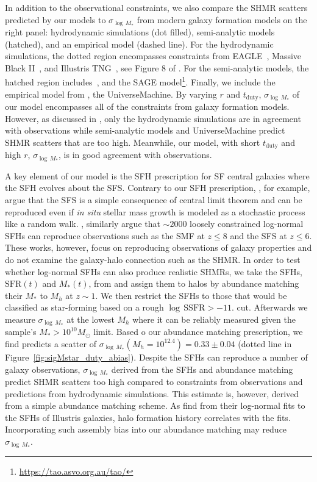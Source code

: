 \documentclass[12pt, letterpaper, preprint, tighten]{aastex62}
\begin{document}
In addition to the observational constraints, we also compare the SHMR 
scatters predicted by our models to $\sigma_{\log\,M_*}$ from modern 
galaxy formation models on the right panel: hydrodynamic simulations 
(dot filled), semi-analytic models (hatched), and an empirical model 
(dashed line). For the hydrodynamic simulations, the dotted region 
encompasses constraints from EAGLE~\citep{mcalpine2016}, Massive 
Black II~\citep{khandai2015}, and Illustris TNG~\citep{pillepich2018}, 
see Figure 8 of \cite{wechsler2018}. For the semi-analytic models, the 
hatched region includes~\cite{lu2014, somerville2012}, 
and the SAGE model\footnote{\url{https://tao.asvo.org.au/tao/}}. Finally, we 
include the empirical model from \cite{behroozi2018a}, the {\sc UniverseMachine}.
By varying $r$ and $t_\mathrm{duty}$, $\sigma_{\log\,M_*}$ of our model 
encompasses all of the constraints from galaxy formation models. However, as
discussed in \cite{wechsler2018}, only the hydrodynamic simulations are in 
agreement with observations while semi-analytic models and {\sc UniverseMachine}
predict SHMR scatters that are too high. Meanwhile, our model, with short 
$t_\mathrm{duty}$ and high $r$, $\sigma_{\log\,M_*}$, is in good agreement with 
observations. 

A key element of our model is the SFH prescription for SF central galaxies where 
the SFH evolves about the SFS. Contrary to our SFH prescription, \cite{kelson2014}, 
for example, argue that the SFS is a simple consequence of central limit theorem 
and can be reproduced even if \emph{in situ} stellar mass growth is modeled as 
a stochastic process like a random walk. \cite{gladders2013,abramson2015,abramson2016}, 
similarly argue that $\sim2000$ loosely constrained log-normal SFHs can reproduce 
observations such as the SMF at $z \leq 8$ and the SFS at $z \leq 6$. These works, 
however, focus on reproducing observations of galaxy properties and do not examine
the galaxy-halo connection such as the SHMR. In order to test whether log-normal 
SFHs can also produce realistic SHMRs, we take the SFHs, $\mathrm{SFR}(t)$ and 
$M_*(t)$, from \cite{abramson2016} and assign them to halos by abundance matching 
their $M_*$ to $M_h$ at $z{\sim}1$. We then restrict the SFHs to those that would 
be classified as star-forming based on a rough $\log\,\mathrm{SSFR} > -11.$ cut.
Afterwards we measure $\sigma_{\log\,M_*}$ at the lowest $M_h$ where it can be 
reliably measured given the \cite{abramson2016} sample's $M_*{>}10^{10}M_\odot$ 
limit. Based o our abundance matching prescription, we find \cite{abramson2016}
predicts a scatter of $\sigma_{\log\,M_*}(M_h=10^{12.4}) = 0.33\pm0.04$ (dotted 
line in Figure~\ref{fig:sigMstar_duty_abias}). Despite the \cite{abramson2016} SFHs 
can reproduce a number of galaxy observations, $\sigma_{\log\,M_*}$ derived from 
the SFHs and abundance matching predict SHMR scatters too high compared to 
constraints from observations and predictions from hydrodynamic simulations. 
This estimate is, however, derived from a simple abundance matching scheme. 
As \cite{diemer2017} find from their log-normal fits to the SFHs of Illustris 
galaxies, halo formation history correlates with the fits. Incorporating such 
assembly bias into our abundance matching may reduce $\sigma_{\log\,M_*}$.
\end{document}
